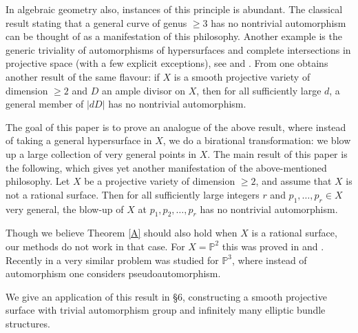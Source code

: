 \documentclass[11pt,letterpaper]{amsart}
\newenvironment{manualtheorem}[1]{%
  \renewcommand\themanualtheoreminner{#1}%
  \manualtheoreminner
}{\endmanualtheoreminner}
\begin{document}
In algebraic geometry also, instances of this principle is abundant. The classical result stating that a general curve of genus $\geq 3$ has no nontrivial automorphism can be thought of as a manifestation of this philosophy. Another example is the generic triviality of automorphisms of hypersurfaces and complete intersections in projective space (with a few explicit exceptions), see \cite{matsumura1963automorphisms} and \cite{lyu2024generic}. From \cite[Theorem 0.2]{lyu2024generic} one obtains another result of the same flavour: if $X$ is a smooth projective variety of dimension $\geq 2$ and $D$ an ample divisor on $X$, then for all sufficiently large $d$, a general member of $|dD|$ has no nontrivial automorphism.

The goal of this paper is to prove an analogue of the above result, where instead of taking a general hypersurface in $X$, we do a birational transformation: we blow up a large collection of very general points in $X$. The main result of this paper is the following, which gives yet another manifestation of the above-mentioned philosophy.
\begin{manualtheorem}{A} \label{A}
Let $X$ be a projective variety of dimension $\geq 2$, and assume that
$X$ is not a rational surface. Then for all sufficiently large integers $r$ and
$p_1,\ldots,p_r\in X$ very general, the blow-up of $X$ at
$p_1,p_2,\ldots,p_r$ has no nontrivial automorphism.
\end{manualtheorem}

Though we believe Theorem \ref{A} should also hold when $X$ is a rational surface, our methods do not work in that case. For $X=\mathbb{P}^2$ this was proved in \cite{koitabashi1988automorphism} and \cite{hirschowitz1988symetries}. Recently in \cite{gachet2025pseudoautomorphism} a very similar problem was studied for $\mathbb{P}^3$, where instead of automorphism one considers pseudoautomorphism.

We give an application of this result in \S 6, constructing a smooth projective surface with trivial automorphism group and infinitely many elliptic bundle structures.
\end{document}
